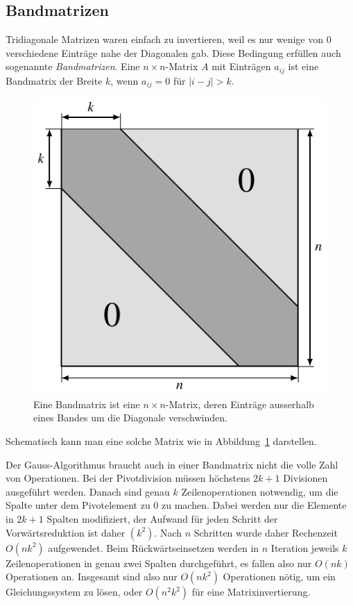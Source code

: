 \subsection{Bandmatrizen}
%
Tridiagonale Matrizen waren einfach zu invertieren, weil es nur wenige
von $0$ verschiedene Einträge nahe der Diagonalen gab.
%
Diese Bedingung erfüllen auch sogenannte {\em Bandmatrizen}.
Eine $n\times n$-Matrix $A$ mit Einträgen $a_{ij}$ ist eine Bandmatrix
der Breite $k$, wenn $a_{ij} = 0$ für $|i-j|>k$.
\begin{figure}
\centering
\includegraphics{chapters/60-linsys/images/bandmatrix.pdf}
\caption{Eine Bandmatrix ist eine $n\times n$-Matrix, deren Einträge
ausserhalb eines Bandes um die Diagonale verschwinden.
%
\label{buch:figure:bandmatrix}}
\end{figure}
Schematisch kann man eine solche Matrix wie in
Abbildung~\ref{buch:figure:bandmatrix} darstellen.

Der Gauss-Algorithmus braucht auch in einer Bandmatrix nicht die
volle Zahl von Operationen.
Bei der Pivotdivision müssen höchstens $2k+1$ Divisionen ausgeführt
werden.
%
Danach sind genau $k$ Zeilenoperationen notwendig, um die Spalte
unter dem Pivotelement zu $0$ zu machen.
%
Dabei werden nur die Elemente in $2k+1$ Spalten modifiziert,
der Aufwand für jeden Schritt der Vorwärtsreduktion ist daher $(k^2)$.
%
Nach $n$ Schritten wurde daher Rechenzeit $O(nk^2)$ aufgewendet.
%
Beim Rückwärtseinsetzen werden in $n$ Iteration jeweils $k$ Zeilenoperationen
in genau zwei Spalten durchgeführt, es fallen also nur $O(nk)$
Operationen an.
%
Insgesamt sind also nur $O(nk^2)$ Operationen nötig, um ein Gleichungssystem
zu lösen, oder $O(n^2k^2)$ für eine Matrixinvertierung.
%

